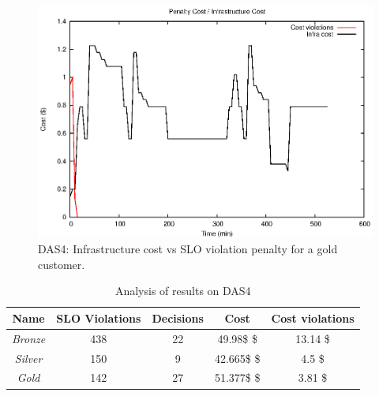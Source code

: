 \begin{figure}
  \begin{center}
    \includegraphics[width=.85\linewidth]{images/exps2011/high/das/penaltyVScost.eps}
  \end{center}
\vspace{-5mm}
  \caption{DAS4: Infrastructure cost vs SLO violation penalty for a gold customer.}
  \label{highPenalty}
\end{figure}

\begin{table}
  {\scriptsize 
\begin{center}
    \begin{tabular}{  | c | c | c | c | c |}
    \hline
         \textbf{Name}  & \textbf{SLO Violations} & \textbf{Decisions}  & \textbf{Cost}  & \textbf{Cost violations} \\ \hline
   \textit{Bronze}   &  438 &  22 &  49.98\$ \$ & 13.14 \$ \\ \hline   
   \textit{Silver}  &  150 &  9 &  42.665\$ \$ &  4.5 \$ \\ \hline   
\textit{Gold} &  142 & 27 & 51.377\$ \$ & 3.81 \$ \\ \hline   

 \end{tabular}
\end{center}
\vspace{-5mm}
\caption{Analysis of results on DAS4}
\label{summaryDAS4}
}
\end{table}
